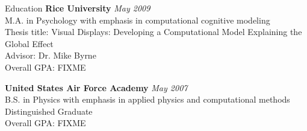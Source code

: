 
\begin{rSection}{Education}
{\bf Rice University} \hfill {\em May 2009} \\ 
M.A. in Psychology with emphasis in computational cognitive modeling \\
Thesis title: Visual Displays: Developing a Computational Model Explaining the Global Effect \\
Advisor: Dr. Mike Byrne \\
Overall GPA: FIXME 

{\bf United States Air Force Academy} \hfill {\em May 2007} \\ 
B.S. in Physics with emphasis in applied physics and computational methods \\
Distinguished Graduate \\
Overall GPA: FIXME
\end{rSection}

